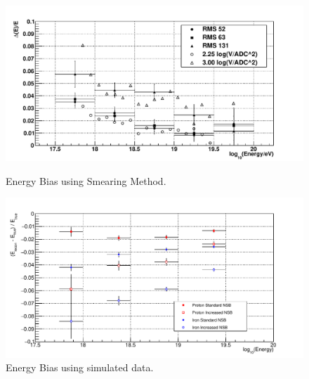 \begin{figure}
\centering
\includegraphics[width=\textwidth]{chapters/graphs/SelectionEff/Smearing_RealData_EnergyBias.pdf}
\caption{Energy Bias using Smearing Method.}
\vspace{3mm}
\includegraphics[width=\textwidth]{chapters/graphs/SelectionEff/Simulation_ProtonIron_EnergyBias.pdf}
\caption{Energy Bias using simulated data.}
\end{figure}


